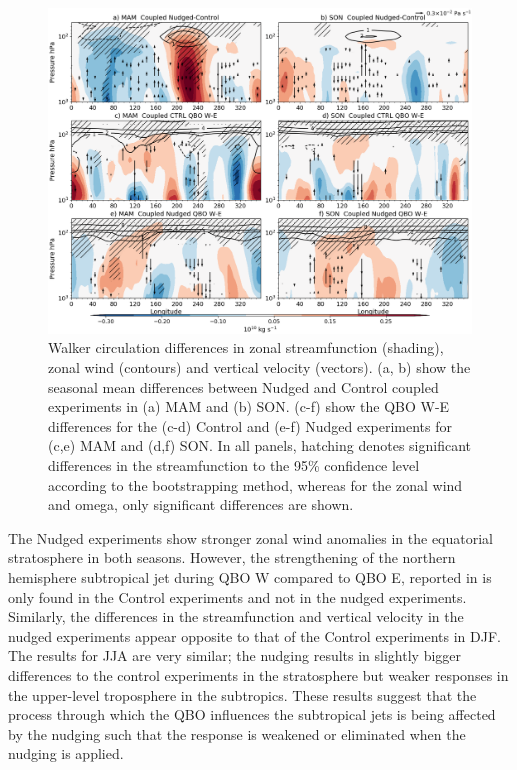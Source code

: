 \begin{figure}[t!]
\centering
 \includegraphics[width=\linewidth]{figures/suite_coupledwalker.png}
\caption[Walker circulation in coupled nudged experiments.]{Walker circulation differences in zonal streamfunction (shading), zonal wind (contours) and vertical velocity (vectors). (a, b) show the seasonal mean differences between Nudged and Control coupled experiments in (a) MAM and (b) SON. (c-f) show the QBO W-E differences for the (c-d) Control and (e-f) Nudged experiments for (c,e) MAM and (d,f) SON. In all panels, hatching denotes significant differences in the streamfunction to the 95\% confidence level according to the bootstrapping method, whereas for the zonal wind and omega, only significant differences are shown.}
\label{fig:walker_coupled}
\end{figure}


The Nudged experiments show stronger zonal wind anomalies in the equatorial stratosphere in both seasons. However, the strengthening of the northern hemisphere subtropical jet during QBO W compared to QBO E, reported in \citep{garfinkel2010} is only found in the Control experiments and not in the nudged experiments. 
Similarly, the differences in the streamfunction and vertical velocity in the nudged experiments appear opposite to that of the Control experiments in DJF. 
The results for JJA are very similar; the nudging results in slightly bigger differences to the control experiments in the stratosphere but weaker responses in the upper-level troposphere in the subtropics.
These results suggest that the process through which the QBO influences the subtropical jets is being affected by the nudging such that the response is weakened or eliminated when the nudging is applied.

